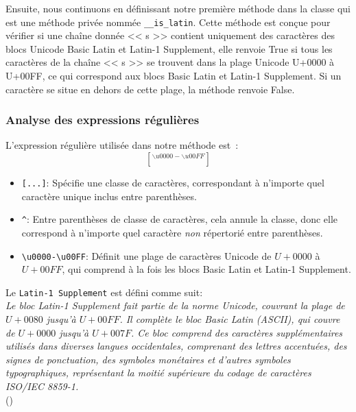 \noindent
Ensuite, nous continuons en définissant notre première méthode dans la classe qui est une méthode privée nommée \texttt{\_\_is\_latin}. Cette méthode est conçue pour vérifier si une chaîne donnée << s >> contient uniquement des caractères des blocs Unicode Basic Latin et Latin-1 Supplement, elle renvoie True si tous les caractères de la chaîne << s >> se trouvent dans la plage Unicode U+0000 à U+00FF, ce qui correspond aux blocs Basic Latin et Latin-1 Supplement. Si un caractère se situe en dehors de cette plage, la méthode renvoie False.

\subsubsection{Analyse des expressions régulières}
\noindent
L'expression régulière utilisée dans notre méthode est :
\Large\[ [^{\backslash u0000-\backslash u00FF}] \]
\begin{itemize}
	\item \texttt{[...]}: Spécifie une classe de caractères, correspondant à n'importe quel caractère unique inclus entre parenthèses.
	\item \texttt{\^{}}: Entre parenthèses de classe de caractères, cela annule la classe, donc elle correspond à n'importe quel caractère \emph{non} répertorié entre parenthèses.
	\item \texttt{\textbackslash u0000-\textbackslash u00FF}: Définit une plage de caractères Unicode de \( U+0000 \) à \( U+00FF \), qui comprend à la fois les blocs Basic Latin et Latin-1 Supplement.
\end{itemize}

\newpage
\noindent
Le \texttt{Latin-1 Supplement} est défini comme suit: \\
\textit{Le bloc Latin-1 Supplement fait partie de la norme Unicode, couvrant la plage de \( U+0080 \) jusqu'à \( U+00FF \). Il complète le bloc Basic Latin (ASCII), qui couvre de \( U+0000 \) jusqu'à \( U+007F \). Ce bloc comprend des caractères supplémentaires utilisés dans diverses langues occidentales, comprenant des lettres accentuées, des signes de ponctuation, des symboles monétaires et d'autres symboles typographiques, représentant la moitié supérieure du codage de caractères ISO/IEC 8859-1.} \\
 (\cite{symbl:latin1supp})



